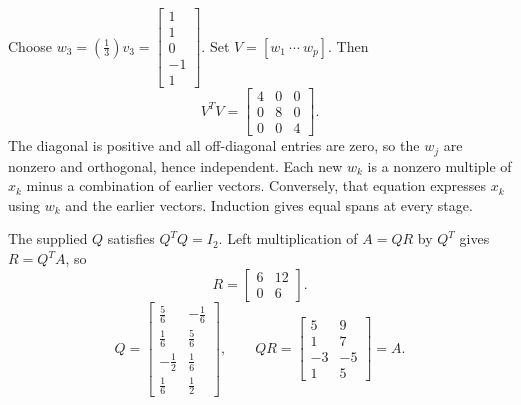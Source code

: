 Choose $w_{3}=(\frac{1}{3})v_{3}=\left[\begin{array}{r}1\\1\\0\\-1\\1\end{array}\right]$.
Set $V=[w_1\ \cdots\ w_p]$. Then
\[V^TV=\left[\begin{array}{rrr}4&0&0\\0&8&0\\0&0&4\end{array}\right].\]
The diagonal is positive and all off-diagonal entries are zero, so the $w_j$ are nonzero and orthogonal, hence independent. Each new $w_k$ is a nonzero multiple of $x_k$ minus a combination of earlier vectors. Conversely, that equation expresses $x_k$ using $w_k$ and the earlier vectors. Induction gives equal spans at every stage.

The supplied $Q$ satisfies $Q^TQ=I_2$. Left multiplication of $A=QR$ by $Q^T$ gives $R=Q^TA$, so
\[R=\left[\begin{array}{rr}6&12\\0&6\end{array}\right].\]
\[Q=\left[\begin{array}{rr}\frac{5}{6}&- \frac{1}{6}\\\frac{1}{6}&\frac{5}{6}\\- \frac{1}{2}&\frac{1}{6}\\\frac{1}{6}&\frac{1}{2}\end{array}\right],\qquad QR=\left[\begin{array}{rr}5&9\\1&7\\-3&-5\\1&5\end{array}\right]=A.\]

